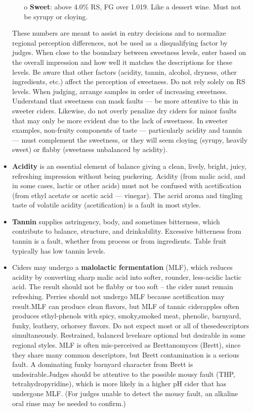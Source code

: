 \begin{itemize}
\begin{itemize}
  \item[o] \textbf{Sweet}: above 4.0\% RS, FG over 1.019. Like a dessert wine. Must not be syrupy or cloying.
  \end{itemize}
These numbers are meant to assist in entry decisions and to normalize regional perception differences, not be used as a disqualifying factor by judges. When close to the boundary between sweetness levels, enter based on the overall impression and how well it matches the descriptions for these levels.
Be aware that other factors (acidity, tannin, alcohol, dryness, other ingredients, etc.) affect the perception of sweetness. Do not rely solely on RS levels.
When judging, arrange samples in order of increasing sweetness. Understand that sweetness can mask faults — be more attentive to this in sweeter ciders. Likewise, do not overly penalize dry ciders for minor faults that may only be more evident due to the lack of sweetness.
In sweeter examples, non-fruity components of taste — particularly acidity and tannin — must complement the sweetness, or they will seem cloying (syrupy, heavily sweet) or flabby (sweetness unbalanced by acidity).
\item \textbf{Acidity} is an essential element of balance giving a clean, lively, bright, juicy, refreshing impression without being puckering. Acidity (from malic acid, and in some cases, lactic or other acids) must not be confused with acetification (from ethyl acetate or acetic acid — vinegar). The acrid aroma and tingling taste of volatile acidity (acetification) is a fault in most styles.
\item \textbf{Tannin} supplies astringency, body, and sometimes bitterness, which contribute to balance, structure, and drinkability. Excessive bitterness from tannin is a fault, whether from process or from ingredients. Table fruit typically has low tannin levels.
\item Ciders may undergo a \textbf{malolactic fermentation} (MLF), which reduces acidity by converting sharp malic acid into softer, rounder, less-acidic lactic acid. The result should not be flabby or too soft – the cider must remain refreshing. Perries should not undergo MLF because acetification may result.MLF can produce clean flavors, but MLF of tannic ciderapples often produces ethyl-phenols with spicy, smoky,smoked meat, phenolic, barnyard, funky, leathery, orhorsey flavors. Do not expect most or all of thesedescriptors simultaneously. Restrained, balanced levelsare optional but desirable in some regional styles. MLF is often mis-perceived as Brettanomyces (Brett), since they share many common descriptors, but Brett contamination is a serious fault. A dominating funky barnyard character from Brett is undesirable.Judges should be attentive to the possible mousy fault (THP, tetrahydropyridine), which is more likely in a higher pH cider that has undergone MLF. (For judges unable to detect the mousy fault, an alkaline oral rinse may be needed to confirm.)
\end{itemize}